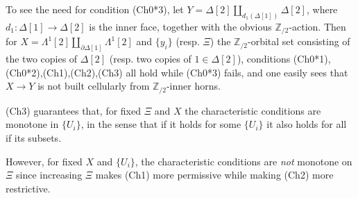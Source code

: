 \documentclass[a4paper,10pt,draft]{article}%
\numberwithin{equation}{section}%
\numberwithin{figure}{section}
\begin{document}
\begin{example}
To see the need for condition (Ch0*3),
let $Y =\Delta[2] \amalg_{d_1(\Delta[1])} \Delta[2]$,
where $d_1 \colon \Delta[1] \to \Delta[2]$
is the inner face,
together with the obvious $\mathbb{Z}_{/2}$-action.
Then for $X = \Lambda^1[2] \amalg_{\partial \Delta[1]} \Lambda^1[2]$ and
$\{y_i\}$ (resp. $\Xi$) the $\mathbb{Z}_{/2}$-orbital set
consisting of the two copies of $\Delta[2]$ (resp. two copies of 
$1 \in \Delta[2]$), 
conditions (Ch0*1),(Ch0*2),(Ch1),(Ch2),(Ch3) all hold while (Ch0*3) fails,
and one easily sees that $X \to Y$ is not built cellularly from 
$\mathbb{Z}_{/2}$-inner horns.
\end{example}


\begin{remark}
	(Ch3) guarantees that, for fixed $\Xi$ and $X$ the characteristic conditions are monotone in $\{U_i\}$, in the sense that if it holds for some $\{U_i\}$ it also holds for all if its subsets.
	
	However, for fixed $X$ and $\{U_i\}$, the characteristic conditions are \textit{not} monotone on $\Xi$ since increasing $\Xi$ makes (Ch1) more permissive while making (Ch2) more restrictive.
\end{remark}
\end{document}
